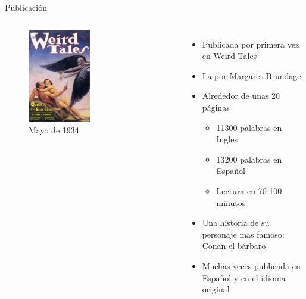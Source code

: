 \begin{frame}{Publicación}
	\begin{columns}
		\begin{figure}[htb]
			\centering
			\includegraphics[width=0.5\textwidth]{img/Weird_Tales_1934-05}
			\caption{Mayo de 1934}
		\end{figure}
		\begin{itemize}
			\item Publicada por primera vez en Weird Tales
			\item La  por Margaret Brundage
			\item Alrededor de unas 20 páginas
			\begin{itemize}
				\item 11300 palabras en Ingles
				\item 13200 palabras en Español
				\item Lectura en 70-100 minutos
			\end{itemize}
			\item Una historia de su personaje mas famoso: Conan el bárbaro
			\item Muchas veces publicada en Español y en el idioma original
		\end{itemize}
	\end{columns}
\end{frame}

